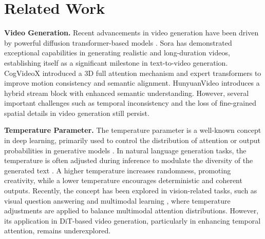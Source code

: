 \section{Related Work}
\textbf{Video Generation.} Recent advancements in video generation have been driven by powerful diffusion transformer-based models \cite{chen2024gentrondiffusiontransformersimage, ma2024lattelatentdiffusiontransformer, gao2024luminat2xtransformingtextmodality, lu2024freelongtrainingfreelongvideo}. Sora \cite{videoworldsimulators2024} has demonstrated exceptional capabilities in generating realistic and long-duration videos, establishing itself as a significant milestone in text-to-video generation. CogVideoX \cite{yang2024cogvideoxtexttovideodiffusionmodels} introduced a 3D full attention mechanism and expert transformers to improve motion consistency and semantic alignment. HunyuanVideo \cite{kong2025hunyuanvideosystematicframeworklarge} introduces a hybrid stream block with enhanced semantic understanding. 
However, several important challenges such as temporal inconsistency and the loss of fine-grained spatial details in video generation still persist.

\textbf{Temperature Parameter.} The temperature parameter is a well-known concept in deep learning, primarily used to control the distribution of attention or output probabilities in generative models \cite{peeperkorn2024temperature, Renze2024TheEO}. In natural language generation tasks, the temperature is often adjusted during inference to modulate the diversity of the generated text \cite{holtzman2020curious}. 
A higher temperature increases randomness, promoting creativity, while a lower temperature encourages deterministic and coherent outputs. 
Recently, the concept has been explored in vision-related tasks, such as visual question answering and multimodal learning \cite{chen2021empirical}, where temperature adjustments are applied to balance multimodal attention distributions. However, its application in DiT-based video generation, particularly in enhancing temporal attention, remains underexplored.